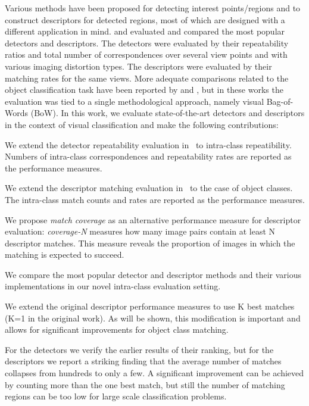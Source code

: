 \documentclass[preprint,authoryear,review]{elsarticle}
\begin{document}
Various methods have been proposed for detecting interest
points/regions and to construct descriptors for detected
regions, most of which are designed with a different application in mind.
\cite{MikTuySch:2005}
and \cite{MikSch:2005} evaluated and
compared the most popular detectors and descriptors. The detectors
were evaluated by their repeatability ratios and total number of 
correspondences over several view points and with various
imaging distortion types. The descriptors were evaluated by their matching
rates for the same views.
More adequate comparisons related to the
object classification task
have been reported by \cite{ZhaMarLaz:2006} and
\cite{MikLeiSch:2005}, but in these works
the evaluation was tied to a single methodological approach, namely
visual Bag-of-Words (BoW). In this work, we evaluate state-of-the-art
detectors and descriptors in the context of visual classification
and make the following contributions:
\begin{compactitem}
\item We extend the detector repeatability evaluation
  in~\cite{MikTuySch:2005} to intra-class repeatibility. Numbers of
  intra-class correspondences and repeatability rates are reported as
  the performance measures.
\item We extend the descriptor matching evaluation in~\cite{MikSch:2005} to
  the case of object classes.
  The intra-class match counts and rates are reported as the performance measures.
\item We propose {\em match coverage} as an alternative performance measure for descriptor evaluation: {\em coverage-N} measures how many image pairs
  contain at least N descriptor matches. This measure reveals the proportion of images in which the matching is expected to succeed.
\item We compare the most popular detector and descriptor methods and their various
  implementations in our novel intra-class evaluation setting.
\item We extend the original descriptor performance measures to use K best matches (K=1 in the
  original work). As will be shown, this modification is important and allows for significant improvements for object class matching.
\item For the detectors we verify the earlier results of their ranking, but for the descriptors
  we report a striking finding that the average number of matches collapses from hundreds to only
  a few. A significant improvement can be achieved by counting more than the one best match, but
  still the number of matching regions can be too low for large scale classification problems.
\end{compactitem}
\end{document}

